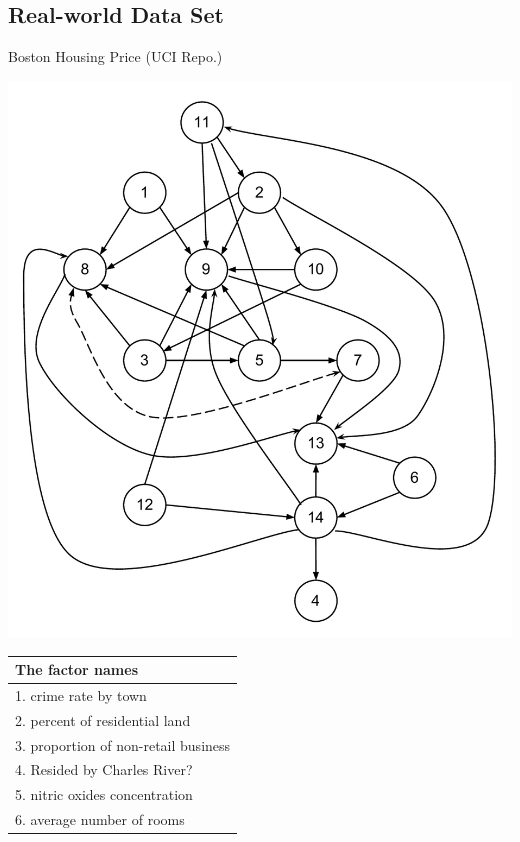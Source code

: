 \subsection{Real-world Data Set}
\begin{frame}{Boston Housing Price (UCI Repo.)}
\begin{minipage}[t]{0.45\linewidth}
 \vspace{0pt}
\centering
\includegraphics[width=\textwidth]{imgs/BostonHousingNetwork}
\end{minipage}\hfill
\begin{minipage}[t]{0.4\linewidth}
 \vspace{0pt}
\centering
\begin{scriptsize}
\begin{tabular}{|l|}
\hline
The factor names\\
\hline
	1. crime rate by town \\
    2. percent of residential land\\
    3. proportion of non-retail business \\
    4. Resided by Charles River?\\
    5. nitric oxides concentration \\
    6. average number of rooms\\

\end{tabular}
\end{scriptsize}
\end{minipage}
\end{frame}
